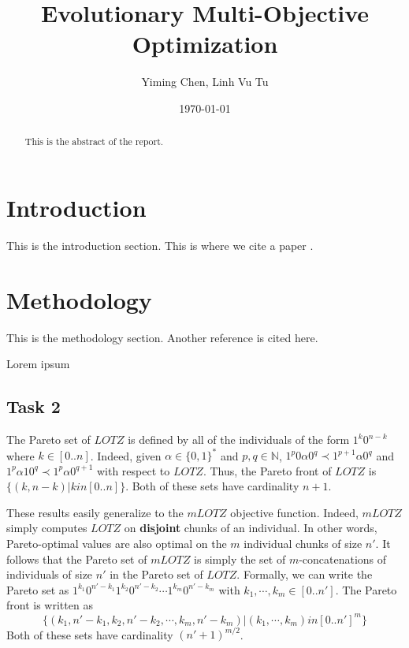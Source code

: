 \documentclass[english]{article}
\begin{document}

\title{Evolutionary Multi-Objective Optimization}
\author{Yiming Chen, Linh Vu Tu}
\date{\today}

\maketitle

\begin{abstract}
    This is the abstract of the report.
\end{abstract}

\section{Introduction}
This is the introduction section. This is where we cite a paper \cite{example2025}.

\section{Methodology}
This is the methodology section. Another reference \cite{samplebook2024} is cited here.

Lorem ipsum


\subsection{Task 2}

The Pareto set of $LOTZ$ is defined by all of the individuals of the form $1^k 0^{n-k}$ where $k \in [0..n]$. Indeed, given $\alpha \in \{0, 1\}^*$ and $p, q \in \mathbb{N}$, $1^p 0 \alpha 0^q \prec 1^{p+1} \alpha 0^q$ and $1^p \alpha 1 0^q \prec 1^p \alpha 0^{q+1}$ with respect to $LOTZ$. Thus, the Pareto front of $LOTZ$ is $\{ (k, n - k) | k in [0..n] \}$. Both of these sets have cardinality $n + 1$.

These results easily generalize to the $mLOTZ$ objective function. Indeed, $mLOTZ$ simply computes $LOTZ$ on \textbf{disjoint} chunks of an individual. In other words, Pareto-optimal values are also optimal on the $m$ individual chunks of size $n'$. It follows that the Pareto set of $mLOTZ$ is simply the set of $m$-concatenations of individuals of size $n'$ in the Pareto set of $LOTZ$. Formally, we can write the Pareto set as $1^{k_1} 0^{n' - k_1} 1^{k_2} 0^{n' - k_2} \cdots 1^{k_m} 0^{n' - k_m}$ with $k_1, \cdots, k_m \in [0..n']$. The Pareto front is written as
$$\{ (k_1, n' - k_1, k_2, n' - k_2, \cdots, k_m, n' - k_m) | (k_1, \cdots, k_m) in [0..n']^m \}$$
Both of these sets have cardinality $(n' + 1)^{m / 2}$.
\end{document}
